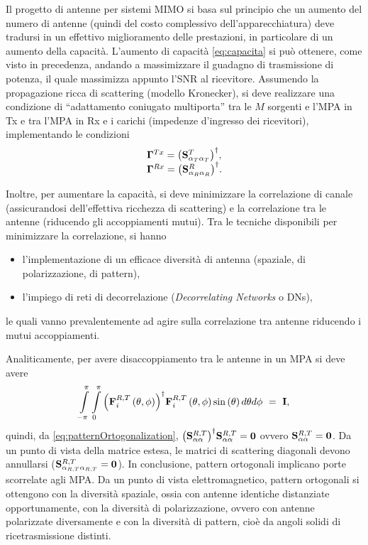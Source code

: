 \documentclass[technote]{IEEEtran}
\begin{document}
\par Il progetto di antenne per sistemi MIMO si basa sul principio che un aumento del numero di antenne (quindi del costo complessivo dell'apparecchiatura) deve tradursi in un effettivo miglioramento delle prestazioni, in particolare di un aumento della capacità. L'aumento di capacità \eqref{eq:capacita} si può ottenere, come visto in precedenza, andando a massimizzare il guadagno di trasmissione di potenza, il quale massimizza appunto l'SNR al ricevitore. Assumendo la propagazione ricca di scattering (modello Kronecker), si deve realizzare una condizione di ``adattamento coniugato multiporta'' tra le $M$ sorgenti e l'MPA in Tx e tra l'MPA in Rx e i carichi (impedenze d'ingresso dei ricevitori), implementando le condizioni
\[\begin{array}{l}
{{\bf{\Gamma }}^{Tx}} = {\left( {{\bf{S}}_{{\alpha _T}{\alpha _T}}^T} \right)^\dagger},\\
{{\bf{\Gamma }}^{Rx}} = {\left( {{\bf{S}}_{{\alpha _R}{\alpha _R}}^R} \right)^\dagger}.
\end{array}\]
\par Inoltre, per aumentare la capacità, si deve minimizzare la correlazione di canale (assicurandosi dell'effettiva ricchezza di scattering) e la correlazione tra le antenne (riducendo gli accoppiamenti mutui). Tra le tecniche disponibili per minimizzare la correlazione, si hanno
\begin{itemize}
\item l'implementazione di un efficace diversità di antenna (spaziale, di polarizzazione, di pattern),
\item l'impiego di reti di decorrelazione (\textit{Decorrelating Networks} o DNs),
\end{itemize}
le quali vanno prevalentemente ad agire sulla correlazione tra antenne riducendo i mutui accoppiamenti.%

\par Analiticamente, per avere disaccoppiamento tra le antenne in un MPA si deve avere
\[\int\limits_{ - \pi }^\pi  {\int\limits_0^\pi  {{{\left( {{\bf{F}}_i^{R,T}\left( {\theta ,\phi } \right)} \right)}^\dagger}{\bf{F}}_i^{R,T}\left( {\theta ,\phi } \right)} } \sin \left( \theta  \right)d\theta d\phi \,\, = \,\,{\bf{I}},\]
quindi, da \eqref{eq:patternOrtogonalization}, ${\left( {{\bf{S}}_{\alpha \alpha }^{R,T}} \right)^\dagger}{\bf{S}}_{\alpha \alpha }^{R,T} = {\bf{0}}$ ovvero ${\bf{S}}_{\alpha \alpha }^{R,T} = {\bf{0}}$. Da un punto di vista della matrice estesa, le matrici di scattering diagonali devono annullarsi (${\bf{S}}_{{\alpha _{R,T}}{\alpha _{R,T}}}^{R,T} = {\bf{0}}$). In conclusione, pattern ortogonali implicano porte scorrelate agli MPA. Da un punto di vista elettromagnetico, pattern ortogonali si ottengono con la diversità spaziale, ossia con antenne identiche distanziate opportunamente, con la diversità di polarizzazione, ovvero con antenne polarizzate diversamente e con la diversità di pattern, cioè da angoli solidi di ricetrasmissione distinti.
\end{document}
